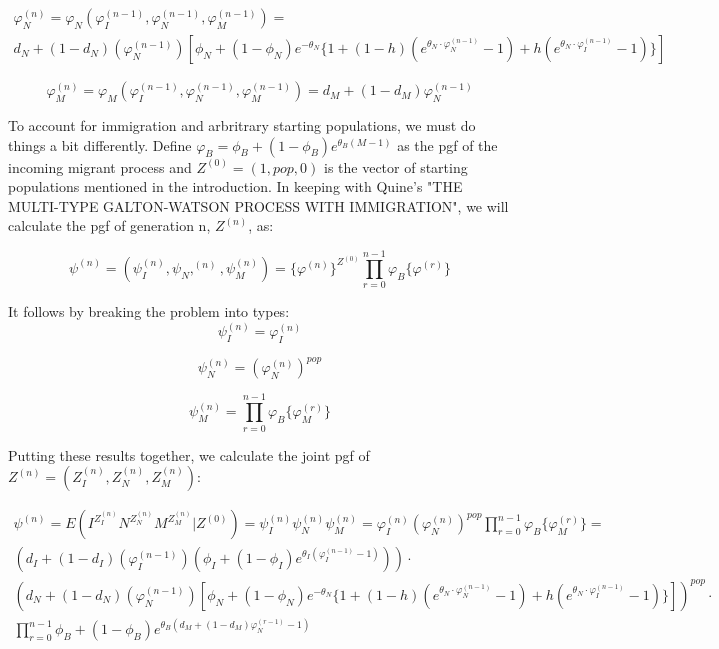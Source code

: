 \documentclass[12pt]{article}
\begin{document}
\begin{multline}
    \varphi_N^{(n)} = \varphi_N(\varphi_I^{(n-1)}, \varphi_N^{(n-1)}, \varphi_M^{(n-1)}) = \\ 
    d_N + (1-d_N)(\varphi_N^{(n-1)})[\phi_N +(1-\phi_N)e^{-\theta_N} \{ 1 +
    (1-h)(e^{\theta_N \cdot \varphi_N^{(n-1)}}-1)+ 
    h(e^{\theta_N \cdot \varphi_I^{(n-1)}}-1)\}]
\end{multline}

\begin{equation}
    \varphi_M^{(n)} = \varphi_M(\varphi_I^{(n-1)}, \varphi_N^{(n-1)}, \varphi_M^{(n-1)}) = d_M + (1-d_M)\varphi_N^{(n-1)}
\end{equation}



To account for immigration and arbritrary starting populations, we must do things a bit differently. Define $\varphi_B = \phi_B + (1-\phi_B)e^{\theta_B (M -1)}$ as the pgf of the incoming migrant process and $Z^{(0)} = (1,pop,0)$ is the vector of starting populations mentioned in the introduction. In keeping with Quine's "THE MULTI-TYPE GALTON-WATSON PROCESS WITH IMMIGRATION", we will calculate the pgf of generation n, $Z^{(n)}$, as:

\begin{equation}
    \psi^{(n)} = (\psi_I^{(n)},\psi_N,^{(n)},\psi_M^{(n)})=\{\varphi^{(n)}\}^{Z^{(0)}} \prod \limits_{r=0}^{n-1} \varphi_B \{\varphi^{(r)}\}
\end{equation}

It follows by breaking the problem into types:
\begin{equation}
    \psi_I^{(n)} = \varphi_I^{(n)}
\end{equation}

\begin{equation}
    \psi_N^{(n)} = (\varphi_N^{(n)})^{pop}
\end{equation}

\begin{equation}
    \psi_M^{(n)} = \prod \limits_{r=0}^{n-1} \varphi_B \{\varphi_M^{(r)}\}
\end{equation}

Putting these results together, we calculate the joint pgf of $Z^{(n)} = (Z_I^{(n)},Z_N^{(n)},Z_M^{(n)})$:

\begin{multline}
    \psi^{(n)} = E(I^{Z_I^{(n)}} N^{Z_N^{(n)}} M^{Z_M^{(n)}}| Z^{(0)}) = \psi_I^{(n)} \psi_N^{(n)} \psi_M^{(n)} =\varphi_I^{(n)}(\varphi_N^{(n)})^{pop} \prod \limits_{r=0}^{n-1} \varphi_B \{\varphi_M^{(r)}\} = \\
    (d_I +(1-d_I)(\varphi_I^{(n-1)})(\phi_I + (1-\phi_I)e^{\theta_I (\varphi_I^{(n-1)} -1)})) \cdot \\
    (d_N +
    (1-d_N)(\varphi_N^{(n-1)})[\phi_N +(1-\phi_N)e^{-\theta_N} \{ 1 +
    (1-h)(e^{\theta_N \cdot \varphi_N^{(n-1)}}-1)+ 
    h(e^{\theta_N \cdot \varphi_I^{(n-1)}}-1)\}])^{pop} \cdot \\
    \prod \limits_{r=0}^{n-1} \phi_B + (1-\phi_B)e^{\theta_B (d_M + (1-d_M)\varphi_N^{(r-1)} -1)}
\end{multline}
\end{document}
